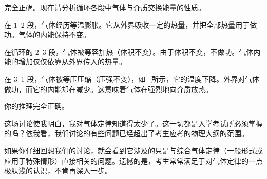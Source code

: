 \begin{dialogue}
\tchr 完全正确。现在请分析循环各段中气体与介质交换能量的性质。

\stdb 在 1--2 段，气体经历等温膨胀。它从外界吸收一定的热量，并把全部热量用于做功。气体的内能保持不变。

在循环的 2--3 段，气体被等容加热（体积不变）。由于体积不变，不做功。气体内能的增加仅仅依靠从外界传入的热量。

在 3--1 段，气体被等压压缩（压强不变），如~ 所示，它的温度下降。外界对气体做功，而它的内能却在减少。这意味着气体在强烈地向介质放热。

\tchr 你的推理完全正确。

\stda 这场讨论使我明白，我对气体定律知道得太少了。这一切都是入学考试所必须掌握的吗？依我看，我们讨论的有些问题已经超出了考生应考的物理大纲的范围。

\tchr 如果你仔细回想我们的讨论，就会看到它涉及的只是与综合气体定律（一般形式或应用于特殊情形）直接相关的问题。遗憾的是，考生常常满足于对气体定律的一点极肤浅的认识，不肯再深入一步。

\end{dialogue}


\cleardoublepage

